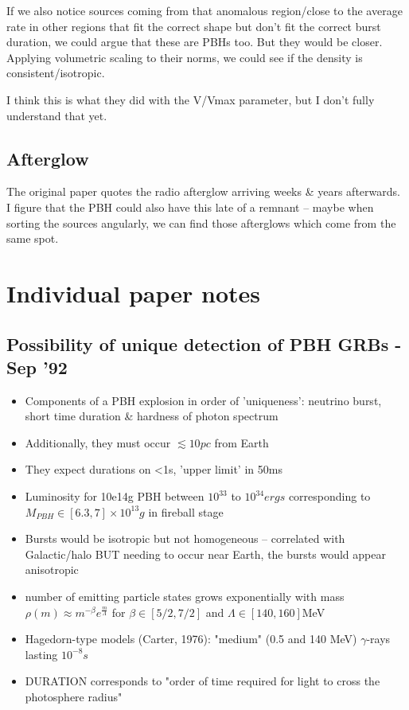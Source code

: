 \documentclass[12pt]{article}
\begin{document}
If we also notice sources coming from that anomalous region/close to the average rate in other regions that fit the correct shape but don't fit the correct burst duration, we could argue that these are PBHs too. But they would be closer. Applying volumetric scaling to their norms, we could see if the density is consistent/isotropic.

I think this is what they did with the V/Vmax parameter, but I don't fully understand that yet.

\subsection{Afterglow}
The original paper quotes the radio afterglow arriving weeks & years afterwards. I figure that the PBH could also have this late of a remnant -- maybe when sorting the sources angularly, we can find those afterglows which come from the same spot.

\section{Individual paper notes}

\subsection{Possibility of unique detection of PBH GRBs - Sep '92}
\begin{itemize}
    \item Components of a PBH explosion in order of 'uniqueness': neutrino burst, short time duration \& hardness of photon spectrum
    \item Additionally, they must occur $\lesssim 10 pc$ from Earth
    \item They expect durations on <1s, 'upper limit' in 50ms
    \item Luminosity for 10e14g PBH between $10^{33}$ to $10^{34} ergs$ corresponding to $M_{PBH} \in [6.3,7]\times 10^{13}g$ in fireball stage
    \item Bursts would be isotropic but not homogeneous -- correlated with Galactic/halo BUT needing to occur near Earth, the bursts would appear anisotropic
    \item number of emitting particle states grows exponentially with mass $\rho(m) \approx m^{-\beta} e^{\frac{m}{\Lambda}}$ for $\beta \in [5/2,7/2]$ and $\Lambda \in [140,160]$MeV
    \item Hagedorn-type models (Carter, 1976): "medium" (0.5 and 140 MeV) $\gamma$-rays lasting $10^{-8}s$
    \item DURATION corresponds to "order of time required for light to cross the photosphere radius"
\end{itemize}
\end{document}
